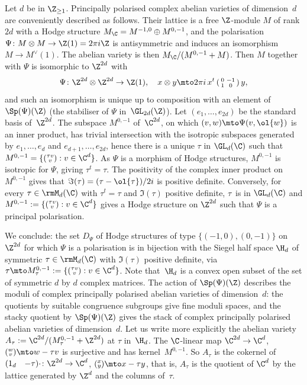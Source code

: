 Let $d$ be in $\Z_{\geq1}$. Principally polarised complex abelian
varieties of dimension~$d$ are conveniently described as
follows. Their lattice is a free $\Z$-module $M$ of rank $2d$ with a
Hodge structure $M_\C=M^{-1,0}\oplus M^{0,-1}$, and the polarisation
$\Psi\colon M\otimes M\to \Z(1)=2\pi i\Z$ is antisymmetric and induces
an isomorphism $M\to M^\vee(1)$. The abelian variety is then
$M_\C/(M^{0,-1}+M)$. Then $M$ together with $\Psi$ is isomorphic to
$\Z^{2d}$ with
\[
\Psi\colon \Z^{2d}\otimes\Z^{2d}\to\Z(1),\quad x\otimes
y\mto 2\pi i\,x^t\,(\begin{smallmatrix} 0 & -1\\ 1 &
0\end{smallmatrix})\,y,
\]
and such an isomorphism is unique up to
composition with an element of~$\Sp(\Psi)(\Z)$ (the stabiliser of
$\Psi$ in~$\GL_{2d}(\Z)$). Let $(e_1,\ldots,e_{2d})$ be the standard
basis of~$\Z^{2d}$. The subspace $M^{0,-1}$ of~$\C^{2d}$, on which
$(v,w)\mto \Psi(v,\ol{w})$ is an inner product, has trivial
intersection with the isotropic subspaces generated by
$e_1,\ldots,e_d$ and $e_{d+1},\ldots,e_{2d}$, hence there is a unique
$\tau$ in $\GL_d(\C)$ such that $M^{0,-1}=\{(\substack{\tau v\\ v}) :
v\in\C^d\}$. As $\Psi$ is a morphism of Hodge structures, $M^{0,-1}$
is isotropic for $\Psi$, giving $\tau^t=\tau$. The positivity of the
complex inner product on $M^{0,-1}$ gives that
$\Im(\tau)=(\tau-\ol{\tau})/2i$ is positive definite. Conversely, for
every $\tau\in\rmM_d(\C)$ with $\tau^t=\tau$ and $\Im(\tau)$ positive
definite, $\tau$~is in $\GL_d(\C)$ and $M^{0,-1}:=\{(\substack{\tau v\\
v}) : v\in\C^d\}$ gives a Hodge structure on $\Z^{2d}$ such that
$\Psi$ is a principal polarisation.

We conclude: the set $D_\Psi$ of Hodge structures of type
$\{(-1,0),(0,-1)\}$ on $\Z^{2d}$ for which $\Psi$ is a polarisation is
in bijection with the Siegel half space $\H_d$ of symmetric
$\tau\in\rmM_d(\C)$ with $\Im(\tau)$ positive definite, via
$\tau\mto M^{0,-1}_\tau:=\{(\substack{\tau v\\ v}) :
v\in\C^d\}$. Note that~$\H_d$ is a convex open subset of the set of
symmetric $d$ by $d$ complex matrices. The action of $\Sp(\Psi)(\Z)$
describes the moduli of complex principally polarised abelian
varieties of dimension~$d$: the quotients by suitable congruence
subgroups give fine moduli spaces, and the stacky quotient by
$\Sp(\Psi)(\Z)$ gives the stack of complex principally polarised
abelian varieties of dimension~$d$. Let us write more explicitly the
abelian variety $A_\tau:=\C^{2d}/(M^{0,-1}_\tau+\Z^{2d})$ at $\tau$
in~$\H_d$. The $\C$-linear map $\C^{2d}\to\C^d$, $(\substack{w\\
v})\mto w-\tau v$ is surjective and has kernel~$M^{0,-1}$. So
$A_\tau$ is the cokernel of $(\begin{matrix} 1_d &
-\tau\end{matrix}){\cdot} \colon\Z^{2d}\to \C^d$, $(\substack{x\\
y})\mto x-\tau y$, that is, $A_\tau$ is the quotient of $\C^d$ by
the lattice generated by $\Z^d$ and the columns of~$\tau$.

